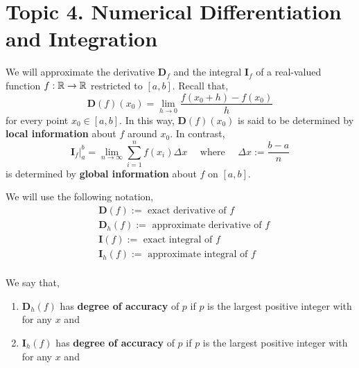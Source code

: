 \section{Topic 4. Numerical Differentiation and Integration}
We will approximate the derivative $\mathbf{D}_f$ and the integral $\mathbf{I}_f$ of a real-valued function $f: \mathbb{R} \rightarrow \mathbb{R}$ restricted to $[a,b]$. Recall that,
\[\mathbf{D}(f)(x_0) = \lim _{h \rightarrow 0} \frac{f\left(x_0+h\right)-f\left(x_0\right)}{h}
\]
for every point $x_0 \in [a, b]$. In this way, $\mathbf{D}(f)(x_0)$ is said to be determined by \textbf{local information} about $f$ around $x_0$. In contrast,
\[\mathbf{I}_f |_a^b = \lim _{n \rightarrow \infty} \sum_{i=1}^n f\left(x_i\right) \Delta x\quad \text{ where } \quad \Delta x := \frac{b-a}{n}\]
is determined by \textbf{global information} about $f$ on $[a, b]$.

\begin{marginfigure}
    We will use the following notation,
    \begin{align*}
        &\mathbf{D}(f) := \text{ exact derivative of } f \\
        &\mathbf{D}_h(f) := \text{ approximate derivative of } f \\
        &\mathbf{I}(f) := \text{ exact integral of } f \\
        &\mathbf{I}_h(f) := \text{ approximate integral of } f \\
    \end{align*}
\end{marginfigure}

\begin{defn}
    We say that,
    \sloppy \begin{enumerate}
        \item $\mathbf{D}_h(f)$ has \textbf{degree of accuracy} of $p$ if $p$ is the largest positive integer with  for any $x$ and 
        \item $\mathbf{I}_h(f)$ has \textbf{degree of accuracy} of $p$ if $p$ is the largest positive integer with  for any $x$ and 
    \end{enumerate}
\end{defn}

